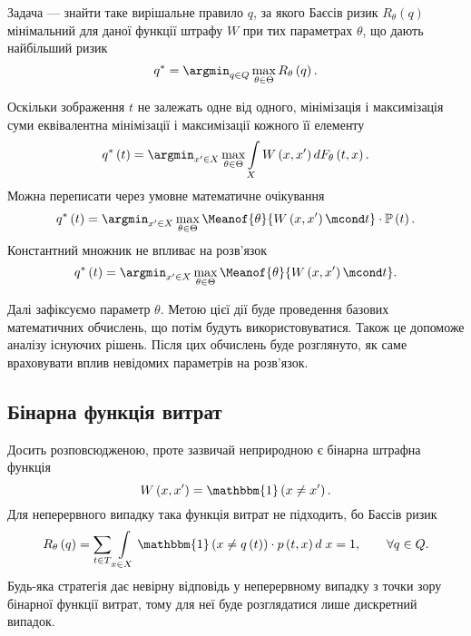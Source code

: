 Задача --- знайти таке вирішальне правило $q$,
за якого Баєсів ризик $R_{\theta}\left( q \right)$ мінімальний
для даної функції штрафу $W$ при тих параметрах $\theta$,
що дають найбільший ризик \cite{schlesinger:2002}
\begin{equation*}
  q^* = \argmin_{q \in Q}
        \max\limits_{\theta \in \Theta} R_{\theta}\left( q \right).
\end{equation*}

Оскільки зображення $t$ не залежать одне від одного,
мінімізація і максимізація суми
еквівалентна мінімізації і максимізації кожного її елементу
\begin{equation*}
  q^*\left( t \right)
  = \argmin_{x' \in X} \max\limits_{\theta \in \Theta}
    \int\limits_{X}
    W \left( x, x' \right)
    d F_{\theta}\left( t, x \right).
\end{equation*}
Можна переписати через умовне математичне очікування
\begin{equation*}
  q^*\left( t \right)
  = \argmin_{x' \in X} \max\limits_{\theta \in \Theta}
    \Meanof{\theta}{W\left( x, x' \right) \mcond t }
    \cdot \mathbb{P}\left( t \right).
\end{equation*}
Константний множник не впливає на розв'язок
\begin{equation*}
  q^*\left( t \right)
  = \argmin_{x' \in X} \max\limits_{\theta \in \Theta}
    \Meanof{\theta}{W\left( x, x' \right) \mcond t}.
\end{equation*}

Далі зафіксуємо параметр $\theta$.
Метою цієї дії буде проведення базових математичних обчислень,
що потім будуть використовуватися.
Також це допоможе аналізу існуючих рішень.
Після цих обчислень буде розглянуто,
як саме враховувати вплив невідомих параметрів на розв'язок.

\subsection{Бінарна функція витрат}

Досить розповсюдженою, проте зазвичай неприродною є бінарна штрафна функція
\begin{equation*}
  W \left( x, x' \right)
  = \mathbbm{1} \left( x \neq x' \right).
\end{equation*}
Для неперервного випадку така функція витрат не підходить,
бо Баєсів ризик
\begin{equation*}
  R_{\theta}\left( q \right)
  = \sum\limits_{t \in T}
    \int\limits_{x \in X}
    \mathbbm{1} \left( x \neq q\left( t \right) \right)
    \cdot p\left( t, x \right) d\; x
  = 1,\qquad
  \forall q \in Q.
\end{equation*}
Будь-яка стратегія дає невірну відповідь у неперервному випадку
з точки зору бінарної функції витрат,
тому для неї буде розглядатися лише дискретний випадок.

